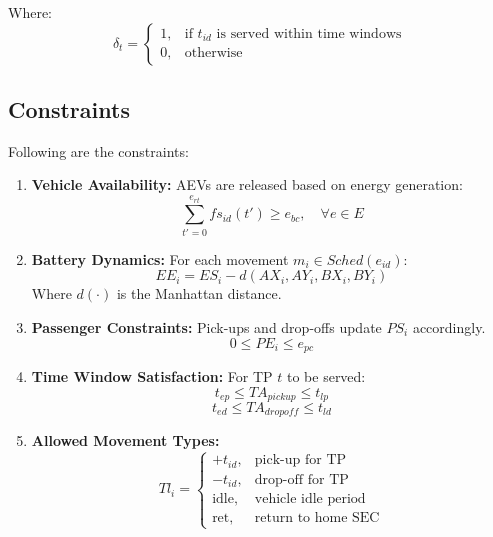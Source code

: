 Where:
\[
\delta_t =
\begin{cases}
1, & \text{if } t_{id} \text{ is served within time windows} \\
0, & \text{otherwise}
\end{cases}
\]

\subsection{Constraints}
Following are the constraints: 
\begin{enumerate}
    \item \textbf{Vehicle Availability:} AEVs are released based on energy generation:    
    \[
    \sum_{t' = 0}^{e_{rt}} fs_{id}(t') \geq e_{bc}, \quad \forall e \in E
    \]
    \item \textbf{Battery Dynamics:} For each movement $m_i \in Sched(e_{id})$:
    \[
    EE_i = ES_i - d(AX_i, AY_i, BX_i, BY_i)
    \]
    Where $d(\cdot)$ is the Manhattan distance.
    \item \textbf{Passenger Constraints:} Pick-ups and drop-offs update $PS_i$ accordingly.
    \[
    0 \leq PE_i \leq e_{pc}
    \]
    \item \textbf{Time Window Satisfaction:} For TP $t$ to be served:
    \[
    t_{ep} \leq TA_{pickup} \leq t_{lp}
    \]
    \[
    t_{ed} \leq TA_{dropoff} \leq t_{ld}
    \]
    \item \textbf{Allowed Movement Types:} \[
    Tl_i =
    \begin{cases}
    +t_{id}, & \text{pick-up for TP} \\
    -t_{id}, & \text{drop-off for TP} \\
    \text{idle}, & \text{vehicle idle period} \\
    \text{ret}, & \text{return to home SEC}
    \end{cases}
    \]
\end{enumerate}

